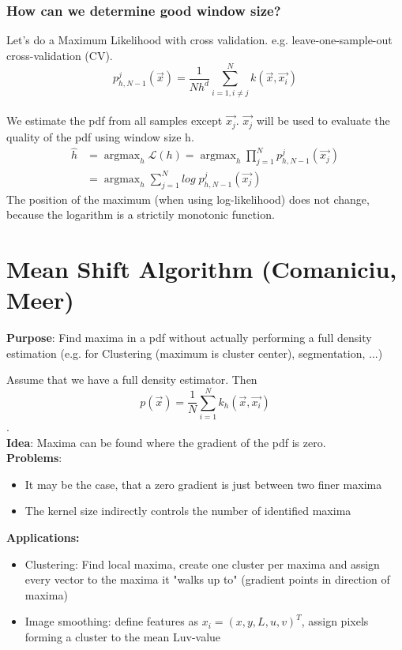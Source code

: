 \documentclass{scrartcl}
\DeclareMathOperator*{\argmax}{argmax} %
\begin{document}
\subsubsection*{How can we determine good window size?}
Let's do a Maximum Likelihood with cross validation. e.g. leave-one-sample-out cross-validation (CV).
\[ p_{h, N-1}^j (\vec{x}) = \frac{1}{N h^d} \sum_{i=1, i \neq j}^{N} k(\vec{x}, \vec{x_i}) \] \\
We estimate the pdf from all samples except \(\vec{x_j}\). \(\vec{x_j}\) will be used to evaluate the quality of the pdf using window size h.
\begin{align*}
\hat{h} &= \argmax_h \mathcal{L}(h) = \argmax_h \prod_{j=1}^{N} p_{h, N-1}^j (\vec{x_j})\\
&= \argmax_h \sum\limits_{j=1}^{N} log \; p_{h, N-1}^j (\vec{x_j})
\end{align*}
The position of the maximum (when using log-likelihood) does not change, because the logarithm is a strictily monotonic function.

\section{Mean Shift Algorithm (Comaniciu, Meer)}
\textbf{Purpose}: Find maxima in a pdf without actually performing a full density estimation (e.g. for Clustering (maximum is cluster center), segmentation, ...)

Assume that we have a full density estimator. Then 
\[p(\vec{x}) = \frac{1}{N} \sum\limits_{i=1}^N k_h (\vec{x}, \vec{x_i}) \].\\
\textbf{Idea}: Maxima can be found where the gradient of the pdf is zero.\\
\textbf{Problems}:
\begin{itemize}
    \item
        It may be the case, that a zero gradient is just between two finer maxima
    \item
        The kernel size indirectly controls the number of identified maxima
\end{itemize}

\textbf{Applications:}
\begin{itemize}
    \item
        Clustering: Find local maxima, create one cluster per maxima  and assign every vector to the maxima it "walks up to" (gradient points in direction of maxima)
    \item
        Image smoothing: define features as \(x_i = (x, y, L, u, v)^T\), assign pixels forming a cluster to the mean Luv-value
\end{itemize}
\end{document}
